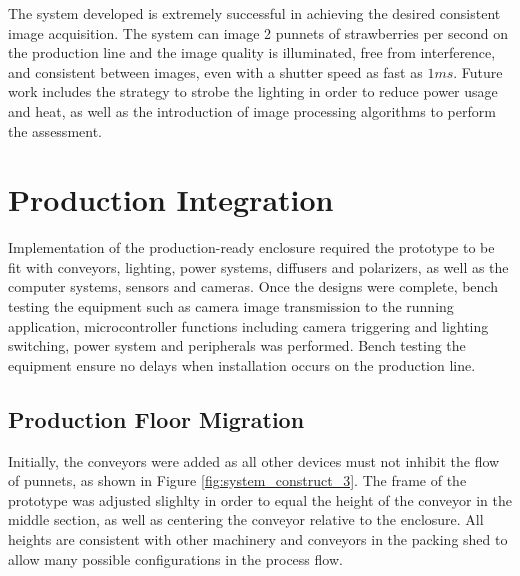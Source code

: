 \documentclass[fleqn,twoside]{article}
\begin{document}
The system developed is extremely successful in achieving the desired consistent image acquisition. The system can image 2 punnets of strawberries per second on the production line and the image quality is illuminated, free from interference, and consistent between images, even with a shutter speed as fast as $1ms$. Future work includes the strategy to strobe the lighting in order to reduce power usage and heat, as well as the introduction of image processing algorithms to perform the assessment.




\newpage

\section{Production Integration}
\label{sec:II}


Implementation of the production-ready enclosure required the prototype to be fit with conveyors, lighting, power systems, diffusers and polarizers, as well as the computer systems, sensors and cameras. Once the designs were complete, bench testing the equipment such as camera image transmission to the running application, microcontroller functions including camera triggering and lighting switching, power system and peripherals was performed. Bench testing the equipment ensure no delays when installation occurs on the production line.





\subsection{Production Floor Migration }


Initially, the conveyors were added as all other devices must not inhibit the flow of punnets, as shown in Figure \ref{fig:system_construct_3}. The frame of the prototype was adjusted slighlty in order to equal the height of the conveyor in the middle section, as well as centering the conveyor relative to the enclosure. All heights are consistent with other machinery and conveyors in the packing shed to allow many possible configurations in the process flow. 
\end{document}
